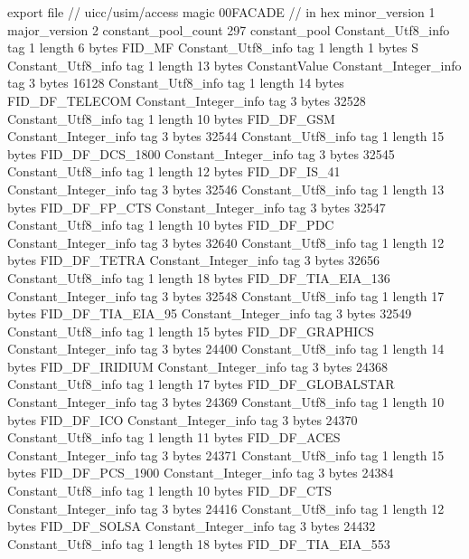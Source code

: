 export file {		// uicc/usim/access
	magic	00FACADE		 // in hex
	minor_version	1
	major_version	2
	constant_pool_count	297
	constant_pool {
		Constant_Utf8_info {
			tag	1
			length	6
			bytes	FID_MF
		}
		Constant_Utf8_info {
			tag	1
			length	1
			bytes	S
		}
		Constant_Utf8_info {
			tag	1
			length	13
			bytes	ConstantValue
		}
		Constant_Integer_info {
			tag	3
			bytes	16128
		}
		Constant_Utf8_info {
			tag	1
			length	14
			bytes	FID_DF_TELECOM
		}
		Constant_Integer_info {
			tag	3
			bytes	32528
		}
		Constant_Utf8_info {
			tag	1
			length	10
			bytes	FID_DF_GSM
		}
		Constant_Integer_info {
			tag	3
			bytes	32544
		}
		Constant_Utf8_info {
			tag	1
			length	15
			bytes	FID_DF_DCS_1800
		}
		Constant_Integer_info {
			tag	3
			bytes	32545
		}
		Constant_Utf8_info {
			tag	1
			length	12
			bytes	FID_DF_IS_41
		}
		Constant_Integer_info {
			tag	3
			bytes	32546
		}
		Constant_Utf8_info {
			tag	1
			length	13
			bytes	FID_DF_FP_CTS
		}
		Constant_Integer_info {
			tag	3
			bytes	32547
		}
		Constant_Utf8_info {
			tag	1
			length	10
			bytes	FID_DF_PDC
		}
		Constant_Integer_info {
			tag	3
			bytes	32640
		}
		Constant_Utf8_info {
			tag	1
			length	12
			bytes	FID_DF_TETRA
		}
		Constant_Integer_info {
			tag	3
			bytes	32656
		}
		Constant_Utf8_info {
			tag	1
			length	18
			bytes	FID_DF_TIA_EIA_136
		}
		Constant_Integer_info {
			tag	3
			bytes	32548
		}
		Constant_Utf8_info {
			tag	1
			length	17
			bytes	FID_DF_TIA_EIA_95
		}
		Constant_Integer_info {
			tag	3
			bytes	32549
		}
		Constant_Utf8_info {
			tag	1
			length	15
			bytes	FID_DF_GRAPHICS
		}
		Constant_Integer_info {
			tag	3
			bytes	24400
		}
		Constant_Utf8_info {
			tag	1
			length	14
			bytes	FID_DF_IRIDIUM
		}
		Constant_Integer_info {
			tag	3
			bytes	24368
		}
		Constant_Utf8_info {
			tag	1
			length	17
			bytes	FID_DF_GLOBALSTAR
		}
		Constant_Integer_info {
			tag	3
			bytes	24369
		}
		Constant_Utf8_info {
			tag	1
			length	10
			bytes	FID_DF_ICO
		}
		Constant_Integer_info {
			tag	3
			bytes	24370
		}
		Constant_Utf8_info {
			tag	1
			length	11
			bytes	FID_DF_ACES
		}
		Constant_Integer_info {
			tag	3
			bytes	24371
		}
		Constant_Utf8_info {
			tag	1
			length	15
			bytes	FID_DF_PCS_1900
		}
		Constant_Integer_info {
			tag	3
			bytes	24384
		}
		Constant_Utf8_info {
			tag	1
			length	10
			bytes	FID_DF_CTS
		}
		Constant_Integer_info {
			tag	3
			bytes	24416
		}
		Constant_Utf8_info {
			tag	1
			length	12
			bytes	FID_DF_SOLSA
		}
		Constant_Integer_info {
			tag	3
			bytes	24432
		}
		Constant_Utf8_info {
			tag	1
			length	18
			bytes	FID_DF_TIA_EIA_553
}}}
